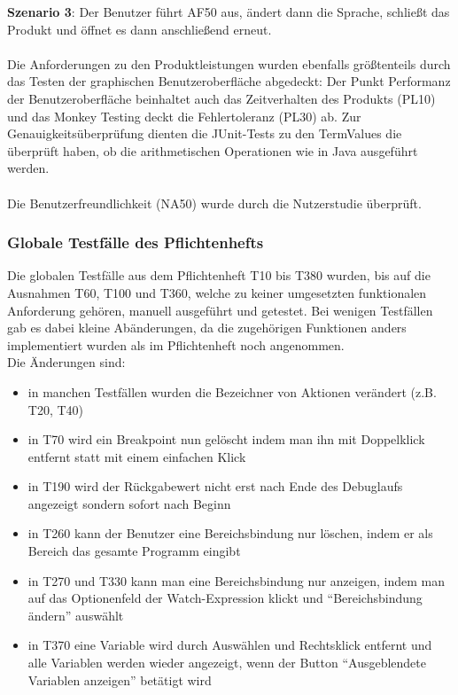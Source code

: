\documentclass[parskip=full]{scrartcl}
\begin{document}
\textbf{Szenario 3}: Der Benutzer führt AF50 aus, ändert dann die Sprache, schließt das Produkt und öffnet es dann anschließend erneut. \\
 \\
Die Anforderungen zu den Produktleistungen wurden ebenfalls größtenteils durch das Testen der graphischen Benutzeroberfläche abgedeckt: Der Punkt Performanz der Benutzeroberfläche beinhaltet auch das Zeitverhalten des Produkts (PL10) und das Monkey Testing deckt die Fehlertoleranz (PL30) ab. Zur Genauigkeitsüberprüfung dienten die JUnit-Tests zu den TermValues die überprüft haben, ob die arithmetischen Operationen wie in Java ausgeführt werden. \\
 \\
Die Benutzerfreundlichkeit (NA50) wurde durch die Nutzerstudie überprüft. 

\subsubsection{Globale Testfälle des Pflichtenhefts} %
Die globalen Testfälle aus dem Pflichtenheft T10 bis T380 wurden, bis auf die Ausnahmen T60, T100 und T360, welche zu keiner umgesetzten funktionalen Anforderung gehören, manuell ausgeführt und getestet. Bei wenigen Testfällen gab es dabei kleine Abänderungen, da die zugehörigen Funktionen anders implementiert wurden als im Pflichtenheft noch angenommen. \\
Die Änderungen sind: \\
\begin{itemize}
	\item in manchen Testfällen wurden die Bezeichner von Aktionen verändert (z.B. T20, T40)
	\item in T70 wird ein Breakpoint nun gelöscht indem man ihn mit Doppelklick entfernt statt mit einem einfachen Klick
	\item  in T190 wird der Rückgabewert nicht erst nach Ende des Debuglaufs angezeigt sondern sofort nach Beginn
	\item in T260 kann der Benutzer eine Bereichsbindung nur löschen, indem er als Bereich das gesamte Programm eingibt
	\item in T270 und T330 kann man eine Bereichsbindung nur anzeigen, indem man auf das Optionenfeld der Watch-Expression klickt und \enquote{Bereichsbindung ändern} auswählt
	\item in T370 eine Variable wird durch Auswählen und Rechtsklick entfernt und alle Variablen werden wieder angezeigt, wenn der Button \enquote{Ausgeblendete Variablen anzeigen} betätigt wird
\end{itemize}
\end{document}
